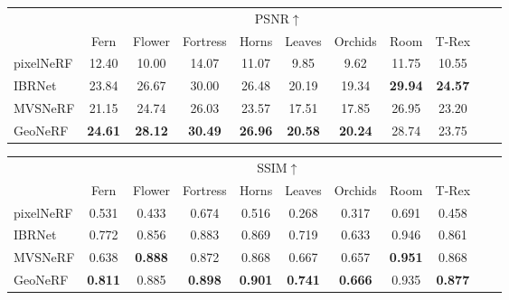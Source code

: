 \begin{table}[!t]
    \begin{center}
        \begin{threeparttable}
            \begin{tabular}{l|cccccccccc}
            & \multicolumn{8}{c}{PSNR$\uparrow$} \\
            &  Fern & Flower & Fortress & Horns & Leaves & Orchids & Room & T-Rex \\
            \hline
            pixelNeRF & 12.40 & 10.00 & 14.07 & 11.07 & \phantom{0}9.85 & \phantom{0}9.62 & 11.75 & 10.55 \\
            IBRNet & 23.84 & 26.67 & 30.00 & 26.48 & 20.19 & 19.34 & \textbf{29.94} & \textbf{24.57} \\
            MVSNeRF & 21.15 & 24.74 & 26.03 & 23.57 & 17.51 & 17.85 & 26.95 & 23.20 \\
            GeoNeRF & \textbf{24.61} & \textbf{28.12} & \textbf{30.49} & \textbf{26.96} & \textbf{20.58} & \textbf{20.24} & 28.74 & 23.75 \\
            \hline
            \end{tabular}
        \end{threeparttable}
    \end{center}

    \vspace{1.0ex}

    \begin{center}
        \begin{threeparttable}
            \begin{tabular}{l|cccccccccc}
            & \multicolumn{8}{c}{SSIM$\uparrow$} \\
            &  Fern & Flower & Fortress & Horns & Leaves & Orchids & Room & T-Rex \\
            \hline
            pixelNeRF & 0.531 & 0.433 & 0.674 & 0.516 & 0.268 & 0.317 & 0.691 & 0.458 \\
            IBRNet & 0.772 & 0.856 & 0.883 & 0.869 & 0.719 & 0.633 & 0.946 & 0.861 \\
            MVSNeRF & 0.638 & \textbf{0.888} & 0.872 & 0.868 & 0.667 & 0.657 & \textbf{0.951} & 0.868 \\
            GeoNeRF & \textbf{0.811} & 0.885 & \textbf{0.898} & \textbf{0.901} & \textbf{0.741} & \textbf{0.666} & 0.935 & \textbf{0.877} \\
            \hline
            \end{tabular}
        \end{threeparttable}
    \end{center}


\end{table}
